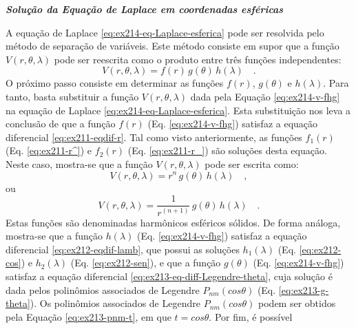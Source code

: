 \documentclass[10pt,a4paper,fleqn]{article}
\begin{document}
\bigskip
\bigskip

\begin{flushleft}
\emph{\textbf{Soluç\~{a}o da Equaç\~{a}o de Laplace em coordenadas esf\'{e}ricas}}
\end{flushleft}

\bigskip
\bigskip

A equação de Laplace \ref{eq:ex214-eq-Laplace-esferica} pode ser resolvida pelo m\'{e}todo de separaç\~{a}o de vari\'{a}veis. 
Este m\'{e}todo consiste em supor que a funç\~{a}o $V(r,\theta,\lambda)$ pode ser reescrita como o produto entre tr\^{e}s funç\~{o}es 
independentes:
\begin{equation}
V(r,\theta,\lambda) = f(r) \, g(\theta) \, h(\lambda) \quad .
\label{eq:ex214-v-fhg}
\end{equation}
O pr\'{o}ximo passo consiste em determinar as funç\~{o}es $f(r)$, $g(\theta)$ e $h(\lambda)$. Para tanto, basta substituir a funç\~{a}o 
$V(r,\theta,\lambda)$ dada pela Equaç\~{a}o \ref{eq:ex214-v-fhg} na equaç\~{a}o de Laplace \ref{eq:ex214-eq-Laplace-esferica}. Esta 
substituiç\~{a}o nos leva a conclus\~{a}o de que a funç\~{a}o $f(r)$ (Eq. \ref{eq:ex214-v-fhg}) satisfaz a equaç\~{a}o diferencial 
\ref{eq:ex211-eqdif-r}. Tal como visto anteriormente, as funç\~{o}es $f_{1}(r)$ (Eq. \ref{eq:ex211-r^}) e $f_{2}(r)$ 
(Eq. \ref{eq:ex211-r_}) s\~{a}o soluç\~{o}es desta equaç\~{a}o. Neste caso, mostra-se que a funç\~{a}o $V(r,\theta,\lambda)$ pode 
ser escrita como:
\begin{equation}
V(r,\theta,\lambda) = r^{n} \, g(\theta) \, h(\lambda) \quad ,
\label{eq:ex214-v-f1gh}
\end{equation}
ou
\begin{equation}
V(r,\theta,\lambda) = \frac{1}{r^{(n+1)}} \, g(\theta) \, h(\lambda) \quad .
\label{eq:ex214-v-f2gh}
\end{equation}
Estas funç\~{o}es s\~{a}o denominadas harm\^{o}nicos esf\'{e}ricos s\'{o}lidos. De forma an\'{a}loga, mostra-se que a funç\~{a}o 
$h(\lambda)$ (Eq. \ref{eq:ex214-v-fhg}) satisfaz a equaç\~{a}o diferencial \ref{eq:ex212-eqdif-lamb}, que possui as soluç\~{o}es 
$h_{1}(\lambda)$ (Eq. \ref{eq:ex212-cos}) e $h_{2}(\lambda)$ (Eq. \ref{eq:ex212-sen}), e que a funç\~{a}o $g(\theta)$ (Eq. 
\ref{eq:ex214-v-fhg}) satisfaz a equaç\~{a}o diferencial \ref{eq:ex213-eq-diff-Legendre-theta}, cuja soluç\~{a}o \'{e} dada 
pelos polin\^{o}mios associados de Legendre $P_{nm}(cos\theta)$ (Eq. \ref{eq:ex213-g-theta}). Os polin\^{o}mios associados de 
Legendre $P_{nm}(cos\theta)$ podem ser obtidos pela Equação \ref{eq:ex213-pnm-t}, em que $t = cos \theta$. Por fim, \'{e} poss\'{i}vel 
\end{document}
